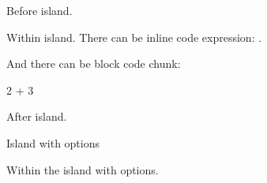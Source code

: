 \documentclass{article}
\begin{document}
Before island.

\begin{island}

Within island. There can be inline code expression: .

And there can be block code chunk:

\begin{chunk}
2 + 3
\end{chunk}

\end{island}

After island.

Island with options

\begin{island}[label-type=table, label=7, style=some-style]

Within the island with options.

\end{island}
\end{document}
